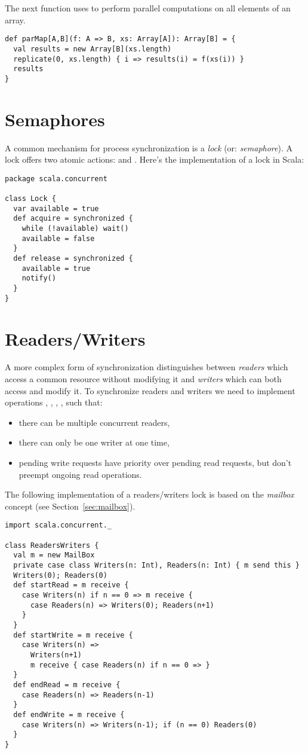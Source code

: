 The next function uses  to perform parallel
computations on all elements of an array.

\begin{lstlisting}
def parMap[A,B](f: A => B, xs: Array[A]): Array[B] = {
  val results = new Array[B](xs.length)
  replicate(0, xs.length) { i => results(i) = f(xs(i)) }
  results
}
\end{lstlisting}

\section{Semaphores}

A common mechanism for process synchronization is a {\em lock} (or:
{\em semaphore}). A lock offers two atomic actions:  and
. Here's the implementation of a lock in Scala:

\begin{lstlisting}
package scala.concurrent

class Lock {
  var available = true
  def acquire = synchronized {
    while (!available) wait()
    available = false
  }
  def release = synchronized {
    available = true
    notify()
  }
}
\end{lstlisting}

\section{Readers/Writers}

A more complex form of synchronization distinguishes between {\em
readers} which access a common resource without modifying it and {\em
writers} which can both access and modify it. To synchronize readers
and writers we need to implement operations , ,
, , such that:
\begin{itemize}
\item there can be multiple concurrent readers,
\item there can only be one writer at one time,
\item pending write requests have priority over pending read requests,
but don't preempt ongoing read operations.
\end{itemize}
The following implementation of a readers/writers lock is based on the
{\em mailbox} concept (see Section~\ref{sec:mailbox}).

\begin{lstlisting}
import scala.concurrent._

class ReadersWriters {
  val m = new MailBox
  private case class Writers(n: Int), Readers(n: Int) { m send this }
  Writers(0); Readers(0)
  def startRead = m receive {
    case Writers(n) if n == 0 => m receive {
      case Readers(n) => Writers(0); Readers(n+1)
    }
  }
  def startWrite = m receive {
    case Writers(n) =>
      Writers(n+1)
      m receive { case Readers(n) if n == 0 => }
  }
  def endRead = m receive {
    case Readers(n) => Readers(n-1)
  }
  def endWrite = m receive {
    case Writers(n) => Writers(n-1); if (n == 0) Readers(0)
  }
}
\end{lstlisting}


